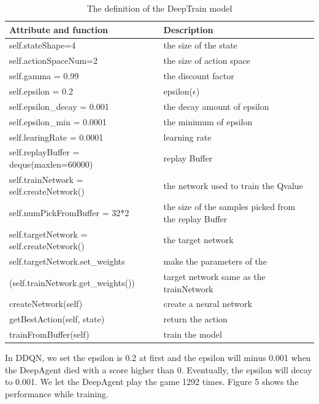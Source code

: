 \documentclass[conference,compsoc]{IEEEtran}
\begin{document}
\begin{table}[!t]
\renewcommand{\arraystretch}{1.3}
\caption{The definition of the DeepTrain model}
\label{table_5}
\centering
\begin{tabular}{|p{110pt}|p{110pt}|}
\hline
Attribute and function & Description\\
\hline
self.stateShape=4 & the size of the state\\
\hline
self.actionSpaceNum=2 & the size of action space\\
\hline
self.gamma = 0.99 & the discount factor\\
\hline
self.epsilon = 0.2 & epsilon(${\epsilon}$)\\
\hline
self.epsilon\_decay = 0.001 & the decay amount of epsilon\\
\hline
self.epsilon\_min = 0.0001 & the minimum of epsilon\\
\hline
self.learingRate = 0.0001 & learning rate\\
\hline
self.replayBuffer = deque(maxlen=60000) & replay Buffer\\
\hline

self.trainNetwork = self.createNetwork() & the network used to train the Qvalue\\
\hline

self.numPickFromBuffer = 32*2 & the size of the samples picked from the replay Buffer\\
\hline

self.targetNetwork = self.createNetwork() & the target network\\
\hline

self.targetNetwork.set\_weights& make the parameters of the\\
(self.trainNetwork.get\_weights()) & target network same as the trainNetwork\\
\hline

createNetwork(self) & create a neural network\\
\hline

getBestAction(self, state) & return the action\\
\hline
trainFromBuffer(self) & train the model\\
\hline
\end{tabular}
\end{table}

In DDQN, we set the epsilon is 0.2 at first and the epsilon will minus 0.001 when the DeepAgent died with a score higher than 0. Eventually, the epsilon will decay to 0.001. We let the DeepAgent play the game 1292 times. Figure 5 shows the performance while training.
\end{document}
